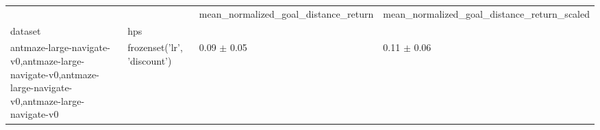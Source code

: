 \begin{tabular}{llll}
\toprule
 &  & mean_normalized_goal_distance_return & mean_normalized_goal_distance_return_scaled \\
dataset & hps &  &  \\
\midrule
antmaze-large-navigate-v0,antmaze-large-navigate-v0,antmaze-large-navigate-v0,antmaze-large-navigate-v0 & frozenset({'lr', 'discount'}) & 0.09 $\pm$ 0.05 & 0.11 $\pm$ 0.06 \\
\cline{1-4}
\bottomrule
\end{tabular}
